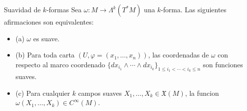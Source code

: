 \begin{booktheorem}{Suavidad de $k$-formas}
Sea $\omega:M\to\Lambda^k(T^*M)$ una $k$-forma. Las siguientes afirmaciones son equivalentes:

\begin{itemize}
\item (a) $\omega$ es suave.
\item (b) Para toda carta $(U,\varphi=(x_1,\ldots,x_n))$, las coordenadas de $\omega$ con respecto al marco coordenado $\{dx_{i_1}\wedge\cdots\wedge dx_{i_k}\}_{1\le i_1<\cdots<i_k\le n}$ son funciones suaves.
\item (c) Para cualquier $k$ campos suaves $X_1,\ldots,X_k\in\mathfrak X(M)$, la funcion $\omega(X_1,\ldots,X_k)\in C^\infty(M)$.
\end{itemize}
\end{booktheorem}
